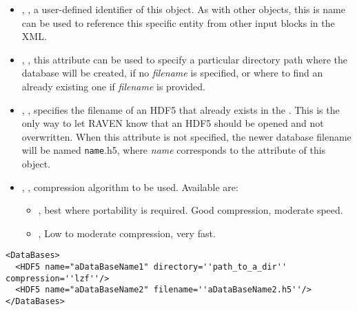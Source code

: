 \begin{itemize}
  \itemsep0em
  \item {}, , a user-defined
  identifier of this object.
  \nb As with other objects, this is name can be used to reference this specific
  entity from other input blocks in the XML.
  \item {}, , this attribute
  can be used to specify a particular directory path where the database will be
  created, if no \textit{filename} is specified, or where to find an already
  existing one if \textit{filename} is provided.
  \item {}, , specifies the
  filename of an HDF5 that already exists in the .
  This is the only way to let RAVEN know that an HDF5 should be opened and not
  overwritten.
  \nb When this attribute is not specified, the newer database filename will be
  named \texttt{name}.h5, where \textit{name} corresponds to the 
  attribute of this object.
  \item {}, , compression
  algorithm to be used.
  Available are:
  \begin{itemize}
    \item {}, best where portability is required.
    Good compression, moderate speed.
    \item {}, Low to moderate compression, very fast.
  \end{itemize}
\end{itemize}

\begin{lstlisting}[style=XML,morekeywords={directory,filename}]
<DataBases>
  <HDF5 name="aDataBaseName1" directory=''path_to_a_dir'' compression=''lzf''/>
  <HDF5 name="aDataBaseName2" filename=''aDataBaseName2.h5''/>
</DataBases>
\end{lstlisting}
